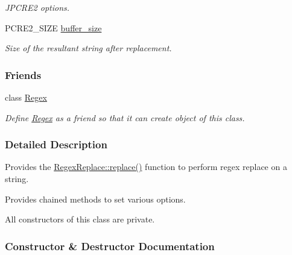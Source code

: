 \begin{DoxyCompactItemize}
\begin{DoxyCompactList}\small\item\em J\+P\+C\+R\+E2 options. \end{DoxyCompactList}\item 
P\+C\+R\+E2\+\_\+\+S\+I\+ZE \hyperlink{classjpcre2_1_1RegexReplace_a44abce541819ceb51e342411b48e95cb}{buffer\+\_\+size}\hypertarget{classjpcre2_1_1RegexReplace_a44abce541819ceb51e342411b48e95cb}{}\label{classjpcre2_1_1RegexReplace_a44abce541819ceb51e342411b48e95cb}

\begin{DoxyCompactList}\small\item\em Size of the resultant string after replacement. \end{DoxyCompactList}\end{DoxyCompactItemize}
\subsubsection*{Friends}
\begin{DoxyCompactItemize}
\item 
class \hyperlink{classjpcre2_1_1RegexReplace_a1f6f7620b7d2218c6c2a6a47f432ea6a}{Regex}\hypertarget{classjpcre2_1_1RegexReplace_a1f6f7620b7d2218c6c2a6a47f432ea6a}{}\label{classjpcre2_1_1RegexReplace_a1f6f7620b7d2218c6c2a6a47f432ea6a}

\begin{DoxyCompactList}\small\item\em Define \hyperlink{classjpcre2_1_1Regex}{Regex} as a friend so that it can create object of this class. \end{DoxyCompactList}\end{DoxyCompactItemize}


\subsubsection{Detailed Description}
Provides the \hyperlink{classjpcre2_1_1RegexReplace_afd087fa7a9bfedec802d1a3dd7edbdd0}{Regex\+Replace\+::replace()} function to perform regex replace on a string. 

Provides chained methods to set various options.

All constructors of this class are private. 

\subsubsection{Constructor \& Destructor Documentation}
